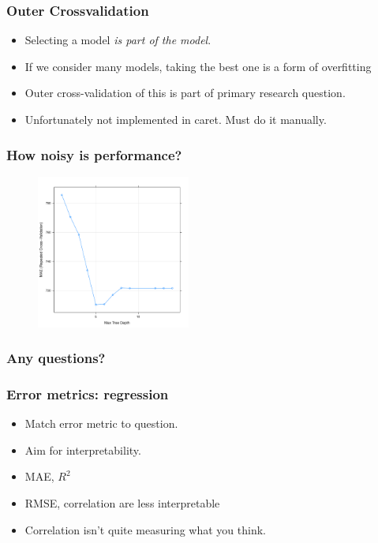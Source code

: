 \documentclass[handout, aspectratio = 169]{beamer}
\begin{document}
\begin{frame}
\frametitle{Outer Crossvalidation}

\begin{itemize}
\item Selecting a model \emph{is part of the model}.
\item If we consider many models, taking the best one is a form of overfitting
\item Outer cross-validation of this is part of primary research question.
\item Unfortunately not implemented in caret. Must do it manually.
\end{itemize}
\end{frame} 




\begin{frame}
\frametitle{How noisy is performance?}
\vspace{-4mm}
\begin{figure}
    \includegraphics[width = 0.45\textwidth]{rpart_perf.pdf}
\end{figure} 
\end{frame} 






\begin{frame}
\frametitle{Any questions?}


\end{frame} 




\begin{frame}
\frametitle{Error metrics: regression}

\begin{itemize}
\item Match error metric to question.
\item Aim for interpretability.
\item MAE, $R^2$
\item RMSE, correlation are less interpretable
\item Correlation isn't quite measuring what you think.
\end{itemize}
\end{frame} 
\end{document}
